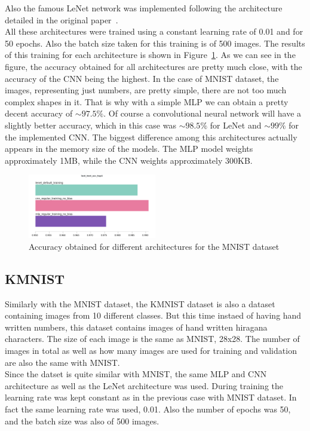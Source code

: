 \documentclass[english,preprint,JIP]{ipsj}
\begin{document}
Also the famous LeNet network was implemented following the architecture
detailed in the original paper~\cite{lenet}.\\

All these architectures were trained using a constant learning rate of 0.01 and
for 50 epochs. Also the batch size taken for this training is of 500 images. The
results of this training for each architecture is shown in
Figure~\ref{fig:mnist_acc}. As we can see in the figure, the accuracy obtained
for all architectures are pretty much close, with the accuracy of the CNN being
the highest. In the case of MNIST dataset, the images, representing just
numbers, are pretty simple, there are not too much complex shapes in it. That is
why with a simple MLP we can obtain a pretty decent accuracy of $\sim 97.5\%$.
Of course a convolutional neural network will have a slightly better accuracy,
which in this case was $\sim 98.5\%$ for LeNet and $\sim 99\%$ for the
implemented CNN. The biggest difference among this architectures actually
appears in the memory size of the models. The MLP model weights approximately
1MB, while the CNN weights approximately 300KB.

\begin{figure}
    \includegraphics[width=0.5\textwidth]{img/mnist.png}
    \caption{Accuracy obtained for different architectures for the MNIST dataset}
    \label{fig:mnist_acc}
\end{figure}

\subsection{KMNIST}
Similarly with the MNIST dataset, the KMNIST dataset is also a dataset
containing images from 10 different classes. But this time instaed of having
hand written numbers, this dataset contains images of hand written hiragana
characters. The size of each image is the same as MNIST, 28x28. The number of
images in total as well as how many images are used for training and validation
are also the same with MNIST.\\

Since the datset is quite similar with MNIST, the same MLP and CNN architecture
as well as the LeNet architecture was used. During training the learning rate
was kept constant as in the previous case with MNIST dataset. In fact the same
learning rate was used, 0.01. Also the number of epochs was 50, and the batch
size was also of 500 images.\\
\end{document}
